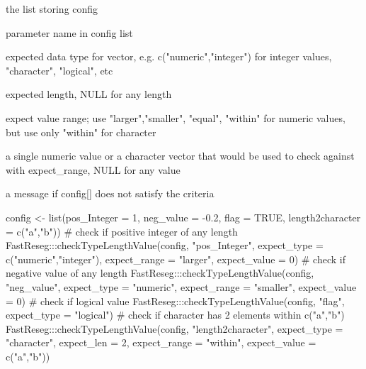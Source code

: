 \documentclass[letterpaper]{book}
\begin{document}
\begin{Arguments}
\begin{ldescription}
\item[\code{config}] the list storing config

\item[\code{name}] parameter name in config list

\item[\code{expect\_type}] expected data type for vector, e.g. c("numeric","integer") for integer values, "character", "logical", etc

\item[\code{expect\_len}] expected length, NULL for any length

\item[\code{expect\_range}] expect value range; use "larger","smaller", "equal", "within" for numeric values, but use only "within" for character

\item[\code{expect\_value}] a single numeric value or a character vector that would be used to check against with expect\_range, NULL for any value
\end{ldescription}
\end{Arguments}
%
\begin{Value}
a message if config[] does not satisfy the criteria
\end{Value}
%
\begin{Examples}
\begin{ExampleCode}
config <- list(pos_Integer = 1, neg_value = -0.2, flag = TRUE,
               length2character = c("a","b"))
# check if positive integer of any length
FastReseg:::checkTypeLengthValue(config, "pos_Integer",
                                 expect_type = c("numeric","integer"),
                                 expect_range = "larger", expect_value = 0)
# check if negative value of any length
FastReseg:::checkTypeLengthValue(config, "neg_value",
                                 expect_type = "numeric",
                                 expect_range = "smaller", expect_value = 0)
# check if logical value
FastReseg:::checkTypeLengthValue(config, "flag", expect_type = "logical")
# check if character has 2 elements within c("a","b")
FastReseg:::checkTypeLengthValue(config, "length2character",
                                 expect_type = "character", expect_len = 2,
                                 expect_range = "within", expect_value = c("a","b"))
\end{ExampleCode}
\end{Examples}
\end{document}

